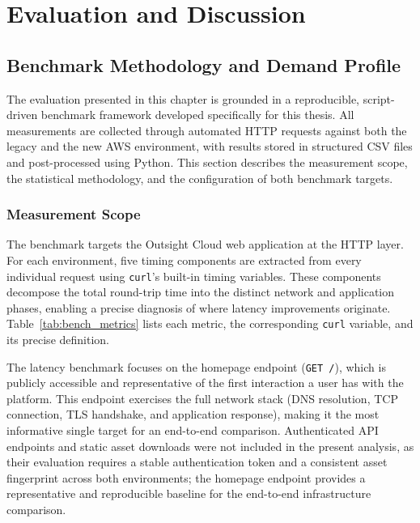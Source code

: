 \chapter{Evaluation and Discussion}
\label{chap:evaluation}

\section{Benchmark Methodology and Demand Profile}

The evaluation presented in this chapter is grounded in a reproducible,
script-driven benchmark framework developed specifically for this thesis.
All measurements are collected through automated HTTP requests against
both the legacy and the new AWS environment, with results stored in
structured CSV files and post-processed using Python.
This section describes the measurement scope, the statistical methodology,
and the configuration of both benchmark targets.

\subsection{Measurement Scope}

The benchmark targets the Outsight Cloud web application at the HTTP layer.
For each environment, five timing components are extracted from every
individual request using \texttt{curl}'s built-in timing variables.
These components decompose the total round-trip time into the distinct
network and application phases, enabling a precise diagnosis of where
latency improvements originate.
Table~\ref{tab:bench_metrics} lists each metric, the corresponding
\texttt{curl} variable, and its precise definition.



The latency benchmark focuses on the homepage endpoint (\texttt{GET /}),
which is publicly accessible and representative of the first interaction
a user has with the platform.
This endpoint exercises the full network stack (DNS resolution, TCP
connection, TLS handshake, and application response), making it the most
informative single target for an end-to-end comparison.
Authenticated API endpoints and static asset downloads were not included
in the present analysis, as their evaluation requires a stable
authentication token and a consistent asset fingerprint across both
environments; the homepage endpoint provides a representative and
reproducible baseline for the end-to-end infrastructure comparison.

